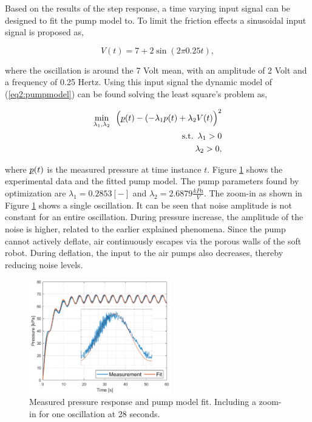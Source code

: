 Based on the results of the step response, a time varying input signal can be designed to fit the pump model to. To limit the friction effects a sinusoidal input signal is proposed as,

\begin{equation}
    V(t) =  7 + 2 \sin(2 \pi 0.25t),
    \label{eq3:vinput}
\end{equation}


where the oscillation is around the 7 Volt mean, with an amplitude of 2 Volt and a frequency of 0.25 Hertz. Using this input signal the dynamic model of (\ref{eq2:pumpmodel}) can be found solving the least square's problem as,

\begin{equation}
   \begin{aligned}
\min_{\lambda_1,\lambda_2} \hspace{5pt}  \Big(\underbar{$p$}(t) - (-\lambda_1 p(t) +\lambda_2 V(t)\Big)^2   \\ 
\text{s.t.} \hspace{5pt} \lambda_1 > 0 \\
\lambda_2 > 0,
\end{aligned}
\end{equation}

where $\underbar{$p$}(t)$ is the measured pressure at time instance $t$. Figure \ref{fig3:pumpfit} shows the experimental data and the fitted pump model. The pump parameters found by optimization are $\lambda_1 = 0.2853 [-]$ and $\lambda_2 = 2.6879 \frac{kPa}{V}$. The zoom-in as shown in Figure \ref{fig3:pumpfit} shows a single oscillation. It can be seen that noise amplitude is not constant for an entire oscillation. During pressure increase, the amplitude of the noise is higher, related to the earlier explained phenomena. Since the pump cannot actively deflate, air continuously escapes via the porous walls of the soft robot. During deflation, the input to the air pumps also decreases, thereby reducing noise levels. 

\begin{figure}[H]
    \centering
    \includegraphics[width = 0.55\textwidth]{Figures/Chapter3/pressurewrap.png}
    \caption{Measured pressure response and pump model fit. Including a zoom-in for one oscillation at 28 seconds.}
    \label{fig3:pumpfit}
\end{figure}


